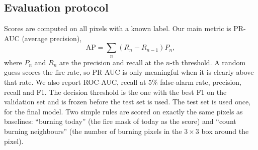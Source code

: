 \subsection{Evaluation protocol}
Scores are computed on all pixels with a known label. Our main metric is PR-AUC (average precision),
\begin{equation}
\mathrm{AP}=\sum_n (R_n-R_{n-1})P_n,
\end{equation}
where $P_n$ and $R_n$ are the precision and recall at the $n$-th threshold. A random guess scores the fire rate, so PR-AUC is only meaningful when it is clearly above that rate. We also report ROC-AUC, recall at 5\% false-alarm rate, precision, recall and F1. The decision threshold is the one with the best F1 on the validation set and is frozen before the test set is used. The test set is used once, for the final model. Two simple rules are scored on exactly the same pixels as baselines: ``burning today'' (the fire mask of today as the score) and ``count burning neighbours'' (the number of burning pixels in the $3\times3$ box around the pixel).
